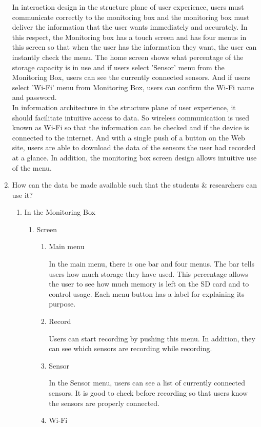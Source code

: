 \documentclass[conference]{IEEEtran}
\begin{document}
\begin{enumerate}
				In interaction design in the structure plane of user experience, users must communicate correctly to the monitoring box and the monitoring box must deliver the information that the user wants immediately and accurately. In this respect, the Monitoring box has a touch screen and has four menus in this screen so that when the user has the information they want, the user can instantly check the menu. The home screen shows what percentage of the storage capacity is in use and if users select 'Sensor' menu from the Monitoring Box, users can see the currently connected sensors. And if users select 'Wi-Fi' menu from Monitoring Box, users can confirm the Wi-Fi name and password.\\
				In information architecture in the structure plane of user experience, it should facilitate intuitive access to data. So wireless communication is used known as Wi-Fi so that the information can be checked and if the device is connected to the internet. And with a single push of a button on the Web site, users are able to download the data of the sensors the user had recorded at a glance. In addition, the monitoring box screen design allows intuitive use of the menu.
\\

			\item How can the data be made available such that the students \& researchers can use it?
				\begin{enumerate}
					\item In the Monitoring Box
				\begin{enumerate}
			\item Screen
				\begin{enumerate}
					\item Main menu

						In the main menu, there is one bar and four menus. The bar tells users how much storage they have used. This percentage allows the user to see how much memory is left on the SD card and to control usage. Each menu button has a label for explaining its purpose.\\
					\item Record

						Users can start recording by pushing this menu. In addition, they can see which sensors are recording while recording.\\
					\item Sensor

						In the Sensor menu, users can see a list of currently connected sensors. It is good to check before recording so that users know the sensors are properly connected.\\
					\item Wi-Fi


\end{enumerate}
\end{enumerate}
\end{enumerate}
\end{enumerate}
\end{document}
